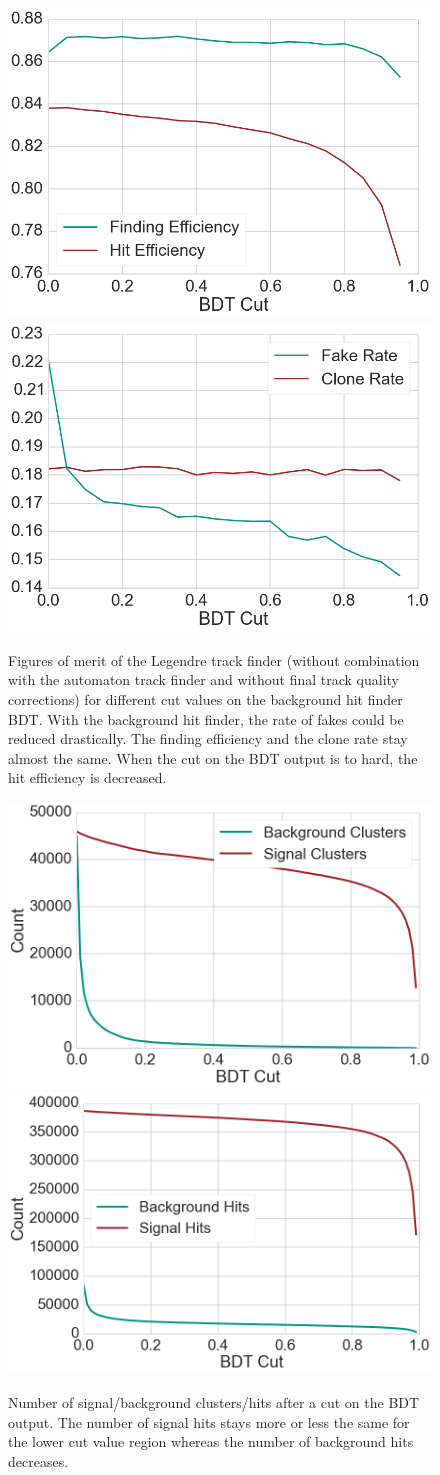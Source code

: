 \begin{figure}
  \centering
  \includegraphics[width=0.48\linewidth]{figures/workflow/background_hit_finder_efficiency.png}
  \includegraphics[width=0.48\linewidth]{figures/workflow/background_hit_finder_rate.png}
  \caption{Figures of merit of the Legendre track finder (without combination with the automaton track finder and without final track quality corrections) for different cut values on the background hit finder BDT. With the background hit finder, the rate of fakes could be reduced drastically. The finding efficiency and the clone rate stay almost the same. When the cut on the BDT output is to hard, the hit efficiency is decreased.}
  \label{fig-result-background-hit-finder2}
\end{figure}

\begin{figure}
  \centering
  \includegraphics[width=0.48\linewidth]{figures/workflow/number_of_clusters.png}
  \includegraphics[width=0.48\linewidth]{figures/workflow/number_of_hits.png}
  \caption{Number of signal/background clusters/hits after a cut on the BDT output. The number of signal hits stays more or less the same for the lower cut value region whereas the number of background hits decreases.}
  \label{fig-hits-numbers}
\end{figure}

